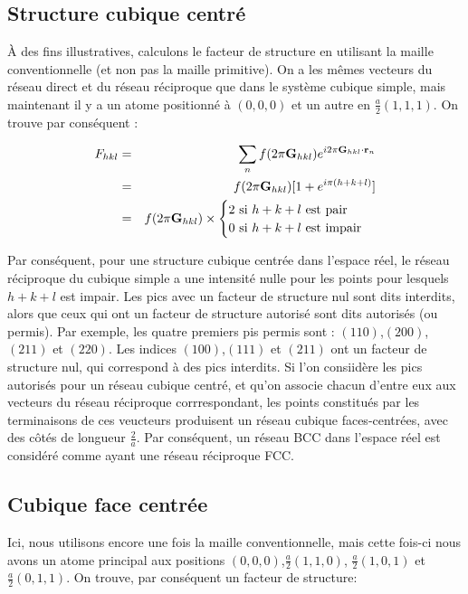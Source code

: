 \subsection{Structure cubique centré}

À des fins illustratives, calculons le facteur de structure en utilisant la
maille conventionnelle (et non pas la maille primitive). On a les mêmes vecteurs
du réseau direct et du réseau réciproque que dans le système cubique simple, mais
maintenant il y a un atome positionné à $(0,0,0)$ et un autre en
$\frac{a}{2}(1,1,1)$. On trouve par conséquent :

\begin{eqnarray}
    F_{hkl} & = & \sum_n f(2\pi\mathbf{G}_{hkl}) e^{i 2\pi \mathbf{G}_{hkl}\cdot\mathbf{r}_n} \\
    & = & f(2\pi \mathbf{G}_{hkl}) [1 + e^{i\pi(h+k+l)}] \\
    & = & f(2\pi \mathbf{G}_{hkl}) \times \begin{cases} 2 \text{ si } h+k+l \text{ est pair}\\ 0 \text{ si } h+k+l \text{ est impair}\end{cases}
\end{eqnarray}

Par conséquent, pour une structure cubique centrée dans l'espace réel, le réseau
réciproque du cubique simple a une intensité nulle pour les points pour lesquels
$h + k + l$ est impair. Les pics avec un facteur de structure nul sont dits
interdits, alors que ceux qui ont un facteur de structure autorisé sont dits
autorisés (ou permis). Par exemple, les quatre premiers pis permis sont :
$(110)$,$(200)$,$(211)$ et $(220)$. Les indices $(100)$,$(111)$ et $(211)$ ont un
facteur de structure nul, qui correspond à des pics interdits. Si l'on consiidère
les pics autorisés pour un réseau cubique centré, et qu'on associe chacun d'entre
eux aux vecteurs du réseau réciproque corrrespondant, les points constitués par
les terminaisons de ces veucteurs produisent un réseau cubique faces-centrées,
avec des côtés de longueur $\frac{2}{a}$. Par conséquent, un réseau BCC dans
l'espace réel est considéré comme ayant une réseau réciproque FCC.

\subsection{Cubique face centrée}

Ici, nous utilisons encore une fois la maille conventionnelle, mais cette fois-ci
nous avons un atome principal aux positions $(0,0,0)$,$\frac{a}{2}(1,1,0)$,
$\frac{a}{2}(1,0,1)$ et $\frac{a}{2}(0,1,1)$. On trouve, par conséquent un
facteur de structure:

